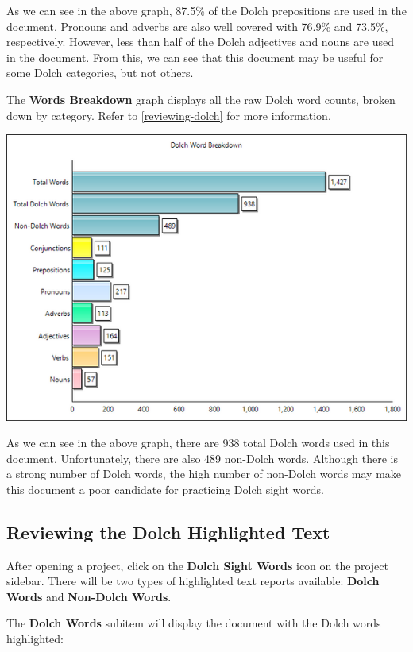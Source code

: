 \documentclass[
]{book}
\theoremstyle{definition}
\theoremstyle{definition}
\theoremstyle{definition}
\theoremstyle{definition}
\theoremstyle{remark}
\begin{document}
As we can see in the above graph, 87.5\% of the Dolch prepositions are used in the document. Pronouns and adverbs are also well covered with 76.9\% and 73.5\%, respectively. However, less than half of the Dolch adjectives and nouns are used in the document. From this, we can see that this document may be useful for some Dolch categories, but not others.

The \textbf{Words Breakdown} graph displays all the raw Dolch word counts, broken down by category. Refer to \ref{reviewing-dolch} for more information.

\begin{center}\includegraphics[width=0.75\linewidth,]{Images/DolchWordBreakdown} \end{center}

As we can see in the above graph, there are 938 total Dolch words used in this document. Unfortunately, there are also 489 non-Dolch words. Although there is a strong number of Dolch words, the high number of non-Dolch words may make this document a poor candidate for practicing Dolch sight words.

\hypertarget{reviewing-dolch-text}{%
\subsection*{Reviewing the Dolch Highlighted Text}\label{reviewing-dolch-text}}

After opening a project, click on the \textbf{Dolch Sight Words} icon on the project sidebar. There will be two types of highlighted text reports available: \textbf{Dolch Words} and \textbf{Non-Dolch Words}.

The \textbf{Dolch Words} subitem will display the document with the Dolch words highlighted:
\end{document}
